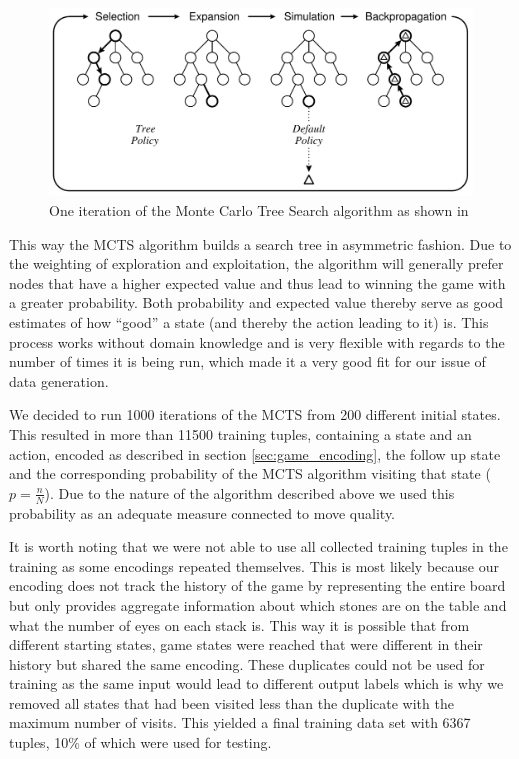 \documentclass[12pt,a4paper]{article}
\begin{document}
\begin{figure}
  \includegraphics[width=\linewidth]{img/mcts.png}
  \centering 
  \caption{ One iteration of the Monte Carlo Tree Search algorithm as shown in \citet{browne_survey_2012}}
  \label{fig:mcts}
\end{figure}

This way the MCTS algorithm builds a search tree in asymmetric fashion. Due to the weighting of exploration and exploitation, the algorithm will generally prefer nodes that have a higher expected value and thus lead to winning the game with a greater probability. Both probability and expected value thereby serve as good estimates of how “good” a state (and thereby the action leading to it) is. This process works without domain knowledge and is very flexible with regards to the number of times it is being run, which made it a very good fit for our issue of data generation.

We decided to run 1000 iterations of the MCTS from 200 different initial states. This resulted in more than 11500 training tuples, containing a state and an action, encoded as described in section \ref{sec:game_encoding}, the follow up state and the corresponding probability of the MCTS algorithm visiting that state ($p = \frac{n}{N}$). Due to the nature of the algorithm described above we used this probability as an adequate measure connected to move quality.

It is worth noting that we were not able to use all collected training tuples in the training as some encodings repeated themselves. This is most likely because our encoding does not track the history of the game by representing the entire board but only provides aggregate information about which stones are on the table and what the number of eyes on each stack is. This way it is possible that from different starting states, game states were reached that were different in their history but shared the same encoding. These duplicates could not be used for training as the same input would lead to different output labels which is why we removed all states that had been visited less than the duplicate with the maximum number of visits. This yielded a final training data set with 6367 tuples, 10\% of which were used for testing.
\end{document}
